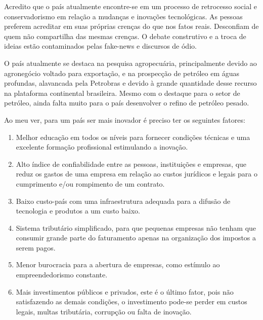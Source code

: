 Acredito que o país atualmente encontre-se em um processo de retrocesso social e conservadorismo em relação a mudanças e inovações tecnológicas. As pessoas preferem acreditar em suas próprias crenças do que nos fatos reais. Desconfiam de quem não compartilha das mesmas crenças. O debate construtivo e a troca de ideias estão contaminados pelas fake-news e discursos de ódio.

O país atualmente se destaca na pesquisa agropecuária, principalmente devido ao agronegócio voltado para exportação, e na prospecção de petróleo em águas profundas, alavancada pela Petrobras e devido à grande quantidade desse recurso na plataforma continental brasileira. Mesmo com o destaque para o setor de petróleo, ainda falta muito para o país desenvolver o refino de petróleo pesado. 

Ao meu ver, para um país ser mais inovador é preciso ter os seguintes fatores:
\begin{enumerate}
    \item Melhor educação em todos os níveis para fornecer condições técnicas e uma excelente formação profissional estimulando a inovação.
    \item Alto índice de confiabilidade entre as pessoas, instituições e empresas, que reduz os gastos de uma empresa em relação ao custos jurídicos e legais para o cumprimento e/ou rompimento de um contrato.
    \item Baixo custo-país com uma infraestrutura adequada para a difusão de tecnologia e produtos a um custo baixo.
    \item Sistema tributário simplificado, para que pequenas empresas não tenham que consumir grande parte do faturamento apenas na organização dos impostos a serem pagos.
    \item Menor burocracia para a abertura de empresas, como estímulo ao empreendedorismo constante.
    \item Mais investimentos públicos e privados, este é o último fator, pois não satisfazendo as demais condições, o investimento pode-se perder em custos legais, multas tributária, corrupção ou falta de inovação.
\end{enumerate}

